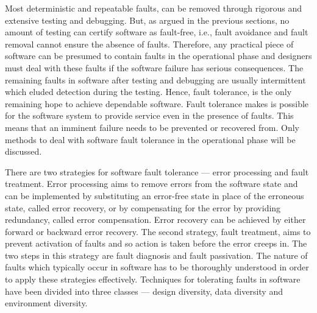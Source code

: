 \documentclass[a4paper, 11pt]{article}
\newcommand{\cmark}{\ding{51}}%
\begin{document}
Most deterministic and repeatable faults, can be removed through rigorous and extensive testing and debugging. But, as argued in the previous sections, no amount of testing can certify software as fault-free, i.e., fault avoidance and fault removal cannot ensure the absence of faults. Therefore, any practical piece of software can be presumed to contain faults in the operational phase and designers must deal with these faults if the software failure has serious consequences. The remaining faults in software after testing and debugging are usually intermittent which eluded detection during the testing. Hence, fault tolerance, is the only remaining hope to achieve dependable software. Fault tolerance makes is possible for the software system to provide service even in the presence of faults. This means that an imminent failure needs to be prevented or recovered from. Only methods to deal with software fault tolerance in the operational phase will be discussed.

There are two strategies for software fault tolerance --- error processing and fault treatment. Error processing aims to remove errors from the software state and can be implemented by substituting an error-free state in place of the erroneous state, called error recovery, or by compensating for the error by providing redundancy, called error compensation. Error recovery can be achieved by either forward or backward error recovery. The second strategy, fault treatment, aims to prevent activation of faults and so action is taken before the error creeps in. The two steps in this strategy are fault diagnosis and fault passivation. The nature of faults which typically occur in software has to be thoroughly understood in order to apply these strategies effectively. Techniques for tolerating faults in software have been divided into three classes --- design diversity, data diversity and environment diversity.

%
\end{document}
